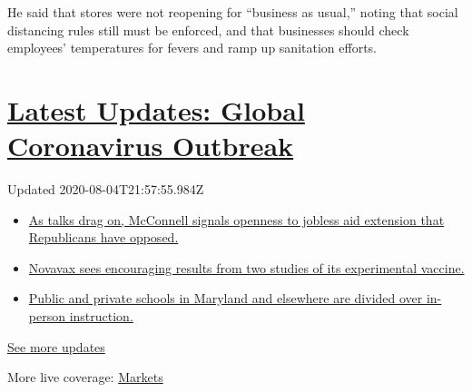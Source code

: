 He said that stores were not reopening for ``business as usual,'' noting
that social distancing rules still must be enforced, and that businesses
should check employees' temperatures for fevers and ramp up sanitation
efforts.

\hypertarget{latest-updates-global-coronavirus-outbreak}{%
\section{\texorpdfstring{\href{https://www.nytimes3xbfgragh.onion/2020/08/04/world/coronavirus-cases.html?action=click\&pgtype=Article\&state=default\&region=MAIN_CONTENT_1\&context=storylines_live_updates}{Latest
Updates: Global Coronavirus
Outbreak}}{Latest Updates: Global Coronavirus Outbreak}}\label{latest-updates-global-coronavirus-outbreak}}

Updated 2020-08-04T21:57:55.984Z

\begin{itemize}
\tightlist
\item
  \href{https://www.nytimes3xbfgragh.onion/2020/08/04/world/coronavirus-cases.html?action=click\&pgtype=Article\&state=default\&region=MAIN_CONTENT_1\&context=storylines_live_updates\#link-2daa96b5}{As
  talks drag on, McConnell signals openness to jobless aid extension
  that Republicans have opposed.}
\item
  \href{https://www.nytimes3xbfgragh.onion/2020/08/04/world/coronavirus-cases.html?action=click\&pgtype=Article\&state=default\&region=MAIN_CONTENT_1\&context=storylines_live_updates\#link-1228a480}{Novavax
  sees encouraging results from two studies of its experimental
  vaccine.}
\item
  \href{https://www.nytimes3xbfgragh.onion/2020/08/04/world/coronavirus-cases.html?action=click\&pgtype=Article\&state=default\&region=MAIN_CONTENT_1\&context=storylines_live_updates\#link-4825b93}{Public
  and private schools in Maryland and elsewhere are divided over
  in-person instruction.}
\end{itemize}

\href{https://www.nytimes3xbfgragh.onion/2020/08/04/world/coronavirus-cases.html?action=click\&pgtype=Article\&state=default\&region=MAIN_CONTENT_1\&context=storylines_live_updates}{See
more updates}

More live coverage:
\href{https://www.nytimes3xbfgragh.onion/live/2020/08/04/business/stock-market-today-coronavirus?action=click\&pgtype=Article\&state=default\&region=MAIN_CONTENT_1\&context=storylines_live_updates}{Markets}

